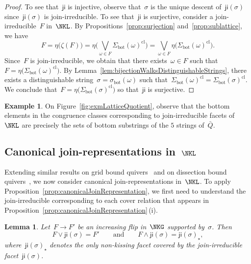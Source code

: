 \documentclass{amsart}
\newtheorem{lemma}[theorem]{Lemma}
\theoremstyle{definition}
\newtheorem{example}[theorem]{Example}
\newcommand{\fref}[1]{Figure~\ref{#1}} %
\newcommand{\bottom}{\mathrm{bot}} %
\newcommand{\meet}{\wedge} %
\newcommand{\join}{\vee} %
\newcommand{\bigJoin}{\bigvee} %
\newcommand{\closure}[1]{#1^{\mathrm{cl}}} %
\newcommand{\ji}{\mathsf{ji}} %
\begin{document}
\begin{proof}
To see that~$\ji$ is injective, observe that~$\sigma$ is the unique descent of~$\ji(\sigma)$ since~$\ji(\sigma)$ is join-irreducible.
%
To see that~$\ji$ is surjective, consider a join-irreducible~$F$ in~$\NKL$.
By Propositions~\ref{prop:surjection} and~\ref{prop:sublattice}, we have
\[
F = \eta \big( \zeta(F) \big) = \eta \Big( \bigJoin_{\omega \in F} \closure{\Sigma_\bottom(\omega)} \Big) = \bigJoin_{\omega \in F} \eta \big( \closure{\Sigma_\bottom(\omega)} \big).
\]
Since~$F$ is join-irreducible, we obtain that there exists~$\omega \in F$ such that~$F = \eta \big( \closure{\Sigma_\bottom(\omega)} \big)$.
By Lemma~\ref{lem:bijectionWalksDistinguishableStrings}, there exists a distinguishable string~$\sigma = \sigma_\bottom(\omega)$ such that~$\closure{\Sigma_\bottom(\omega)} = \closure{\Sigma_\bottom(\sigma)}$.
We conclude that~$F = \eta \big( \closure{\Sigma_\bottom(\sigma)} \big)$ so that~$\ji$ is surjective.
\end{proof}

\begin{example}
On \fref{fig:exmLatticeQuotient}, observe that the bottom elements in the congruence classes corresponding to join-irreducible facets of~$\NKL$ are precisely the sets of bottom substrings of the $5$ strings of~$\bar Q$.
\end{example}

\subsection{Canonical join-representations in~$\NKL$}

Extending similar results on grid bound quivers~\cite{GarverMcConville-grid} and on dissection bound quivers~\cite{GarverMcConville}, we now consider canonical join-represen\-tations in~$\NKL$.
To apply Proposition~\ref{prop:canonicalJoinRepresentation}, we first need to understand the join-irreducible corresponding to each cover relation that appears in  Proposition~\ref{prop:canonicalJoinRepresentation}\,(i).

\begin{lemma}
Let~$F \to F'$ be an increasing flip in~$\NKG$ supported by~$\sigma$. Then
\[
F \join \ji(\sigma) = F'
\qquad\text{and}\qquad
F \meet \ji(\sigma) = \ji(\sigma)_\star,
\]
where~$\ji(\sigma)_\star$ denotes the only non-kissing facet covered by the join-irreducible facet~$\ji(\sigma)$.
\end{lemma}
\end{document}
